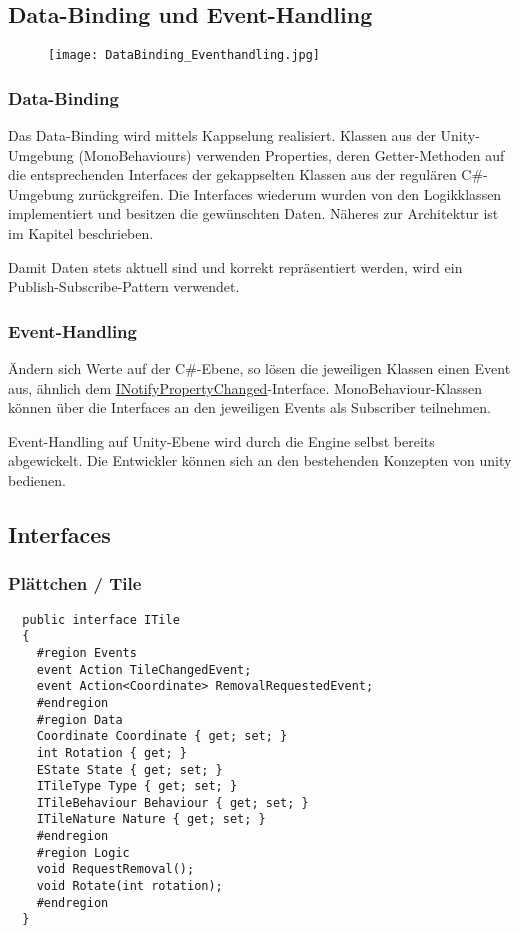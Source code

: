 \documentclass[../main.tex]{subfiles}
\begin{document}
	\subsection{Data-Binding und Event-Handling}
	\begin{figure}[H]
		\centering
		\texttt{[image: DataBinding\_Eventhandling.jpg]}
	\end{figure}
	\subsubsection{Data-Binding}
	\par Das Data-Binding wird mittels Kappselung realisiert. Klassen aus der Unity-Umgebung (MonoBehaviours) verwenden Properties, deren Getter-Methoden auf die entsprechenden Interfaces der gekappselten Klassen aus der regulären C\#-Umgebung zurückgreifen. Die Interfaces wiederum wurden von den Logikklassen implementiert und besitzen die gewünschten Daten. Näheres zur Architektur ist im Kapitel  beschrieben.
	\par Damit Daten stets aktuell sind und korrekt repräsentiert werden, wird ein Publish-Subscribe-Pattern verwendet.
	
	\subsubsection{Event-Handling}
	\par Ändern sich Werte auf der C\#-Ebene, so lösen die jeweiligen Klassen einen Event aus, ähnlich dem \href{https://docs.microsoft.com/en-us/dotnet/api/system.componentmodel.inotifypropertychanged?view=net-5.0}{INotifyPropertyChanged}-Interface. MonoBehaviour-Klassen können über die Interfaces an den jeweiligen Events als Subscriber teilnehmen.
	\par Event-Handling auf Unity-Ebene wird durch die Engine selbst bereits abgewickelt. Die Entwickler können sich an den bestehenden Konzepten von \gls{unity} bedienen.
	
	\subsection{Interfaces}
	\label{section:Interfaces}
	\subsubsection{Plättchen / Tile}
	\begin{lstlisting}
  public interface ITile
  {
	#region Events
	event Action TileChangedEvent;
	event Action<Coordinate> RemovalRequestedEvent;
	#endregion
	#region Data
	Coordinate Coordinate { get; set; }
	int Rotation { get; }
	EState State { get; set; }
	ITileType Type { get; set; }
	ITileBehaviour Behaviour { get; set; }
	ITileNature Nature { get; set; }
	#endregion
	#region Logic
	void RequestRemoval();
	void Rotate(int rotation);
	#endregion
  }
	\end{lstlisting}
\end{document}
